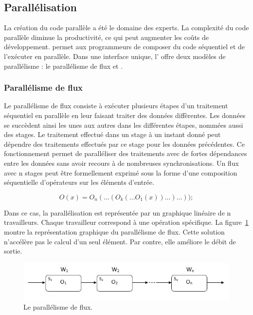 \subsection{Parall\'elisation}

La cr\'eation du code parall\`ele a \'et\'e le domaine des experts. La complexit\'e du code parall\`ele diminue la productivit\'e, ce qui peut augmenter les co\^uts de d\'eveloppement.  permet aux programmeurs de composer du code s\'equentiel et de l'ex\'ecuter en parall\`ele. Dans une interface unique, l' offre deux mod\`eles de parall\'elisme : le parall\'elisme de flux et .


\subsubsection{Parall\'elisme de flux}

Le parall\'elisme de flux consiste \`a ex\'ecuter plusieurs \'etapes d'un traitement s\'equentiel en parall\`ele en leur faisant traiter des données diff\`erentes. Les donn\'ees se succ\`edent ainsi les unes aux autres dans les diff\'erentes \'etapes, nomm\'ees aussi des stages. Le traitement effectu\'e dans un stage \`a un instant donn\'e peut d\'ependre des traitements effectu\'es par ce stage pour les donn\'ees pr\'ec\'edentes. Ce fonctionnement permet de parall\'eliser des traitements avec de fortes d\'ependances entre les donn\'ees sans avoir recours \`a de nombreuses synchronisations. 
Un flux avec n stages peut \^etre formellement exprim\'e sous la forme d'une composition s\'equentielle d'op\'erateurs sur les \'el\'ements d'entr\'ee. 

\[
	O(x) = O_n( \ldots (O_k( \ldots O_1(x)) \ldots ) \ldots ));
\]

Dans ce cas, la parall\'elisation est repr\'esent\'ee par un graphique lin\'eaire de n travailleurs. Chaque travailleur correspond \`a une op\'eration sp\'ecifique. La figure~\ref{ParallelismeDuFlux.fig} montre la repr\'esentation graphique du parall\'elisme de flux. Cette solution n'acc\'el\`ere pas le calcul d'un seul \'el\'ement. Par contre, elle am\'eliore le d\'ebit de sortie.

\begin{figure}[ht]
\centering
     \includegraphics[width=1.0\textwidth]{Figures/ParallelismeDuFlux.jpg}
      \caption{Le parall\'elisme de flux.}
       \label{ParallelismeDuFlux.fig}
\end{figure}


